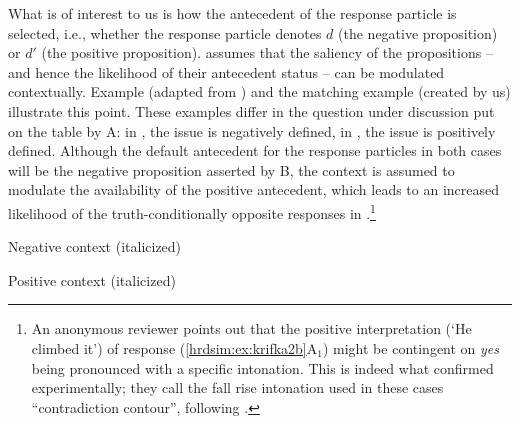 \documentclass[output=paper,colorlinks,citecolor=brown]{langscibook}
\begin{document}
\largerpage[-1]
\noindent What is of interest to us is how the antecedent of the response particle is selected, i.e., whether the response particle denotes $d$ (the negative proposition) or $d'$ (the positive proposition). \citet{hrd+:krifka13} assumes that the saliency of the propositions -- and hence the likelihood of their antecedent status -- can be modulated contextually. Example  (adapted from \citealt[14]{hrd+:krifka13}) and the matching example  (created by us) illustrate this point. These examples differ in the question under discussion put on the table by A: in , the issue is negatively defined, in , the issue is positively defined. Although the default antecedent for the response particles in both cases will be the negative proposition asserted by B, the context is assumed to modulate the availability of the positive antecedent, which leads to an increased likelihood of the truth-conditionally opposite responses in .\footnote{An anonymous reviewer points out that the positive interpretation (`He climbed it') of response (\ref{hrdsim:ex:krifka2b}A$_1$) might be contingent on \textit{yes} being pronounced with a specific intonation. This is indeed what \citet{Goodhue.Wagner2018} confirmed experimentally; they call the fall rise intonation used in these cases ``contradiction contour'', following \citet{Liberman.Sag1974}.\label{fn:goodhue-wagner}}

\ea Negative context (italicized)\label{hrdsim:ex:krifka2}
\begin{xlist}
\end{xlist}
\z

\ea Positive context (italicized)\label{hrdsim:ex:krifka2b}
\begin{xlist}
\end{xlist}
\z
\end{document}
